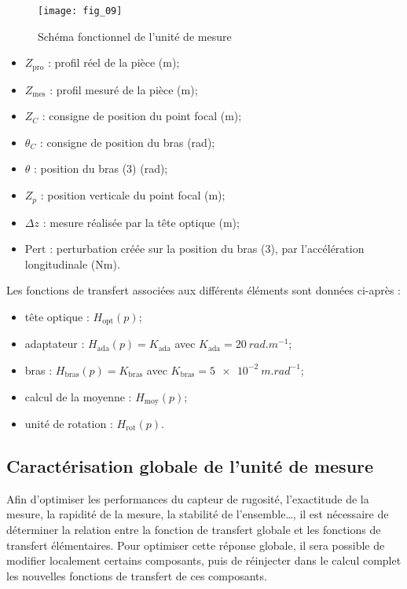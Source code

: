 \begin{figure}[H]
\centering
\texttt{[image: fig\_09]}
\caption{\label{fig_09} Schéma fonctionnel de l’unité de mesure}
\end{figure}

\begin{multicols}{2}
\begin{itemize}
\item $Z_{\text{pro}}$ : profil réel de la pièce (m);
\item $Z_{\text{mes}}$ : profil mesuré de la pièce (m);
\item $Z_{C}$ : consigne de position du point focal (m);
\item $\theta_{C}$ : consigne de position du bras (\si{rad});
\item $\theta$ : position du bras (3) (\si{rad});
\item $Z_{p}$ : position verticale du point focal (m);
\item $\Delta z$ : mesure réalisée par la tête optique (m);
\item $\text{Pert}$ : perturbation créée sur la position du bras (3), par l'accélération longitudinale (\si{Nm}).
\end{itemize}
\end{multicols}

Les fonctions de transfert associées aux différents éléments sont données ci-après : 
\begin{itemize}
\item tête optique : $H_{\text{opt}}(p)$;
\item adaptateur : $H_{\text{ada}}(p)=K_{\text{ada}}$ avec $K_{\text{ada}}=\SI{20}{rad.m^{-1}}$;
\item bras : $H_{\text{bras}}(p)=K_{\text{bras}}$ avec $K_{\text{bras}}=\SI{5e-2}{m.rad^{-1}}$;
\item calcul de la moyenne : $H_{\text{moy}}(p)$;
\item unité de rotation : $H_{\text{rot}}(p)$.
\end{itemize}

\fi


\subsection{Caractérisation globale de l'unité de mesure}

\ifprof
\else
Afin d’optimiser les performances du capteur de rugosité, l’exactitude de la mesure, la rapidité de la
mesure, la stabilité de l’ensemble…, il est nécessaire de déterminer la relation entre la fonction de transfert
globale et les fonctions de transfert élémentaires. Pour optimiser cette réponse globale, il sera possible de
modifier localement certains composants, puis de réinjecter dans le calcul complet les nouvelles fonctions
de transfert de ces composants.
\fi

